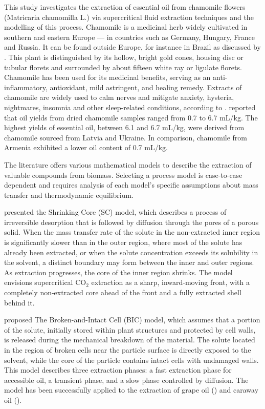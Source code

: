 \documentclass[../Article_Model_Parameters.tex]{subfiles}
\begin{document}
	This study investigates the extraction of essential oil from chamomile flowers (Matricaria chamomilla L.) via supercritical fluid extraction techniques and the modelling of this process. Chamomile is a medicinal herb widely cultivated in southern and eastern Europe — in countries such as Germany, Hungary, France and Russia. It can be found outside Europe, for instance in Brazil as discussed by \citet{Singh2011}. This plant is distinguished by its hollow, bright gold cones, housing disc or tubular florets and surrounded by about fifteen white ray or ligulate florets. Chamomile has been used for its medicinal benefits, serving as an anti-inflammatory, antioxidant, mild astringent, and healing remedy. Extracts of chamomile are widely used to calm nerves and mitigate anxiety, hysteria, nightmares, insomnia and other sleep-related conditions, according to \citet{Srivastava2009}. \citet{Orav2010} reported that oil yields from dried chamomile samples ranged from 0.7 to 6.7 mL/kg. The highest yields of essential oil, between 6.1 and 6.7 mL/kg, were derived from chamomile sourced from Latvia and Ukraine. In comparison, chamomile from Armenia exhibited a lower oil content of 0.7 mL/kg.
	
	The literature offers various mathematical models to describe the extraction of valuable compounds from biomass. Selecting a process model is case-to-case dependent and requires analysis of each model's specific assumptions about mass transfer and thermodynamic equilibrium.
	
	\citet{Goto1996} presented the Shrinking Core (SC) model, which describes a process of irreversible desorption that is followed by diffusion through the pores of a porous solid. When the mass transfer rate of the solute in the non-extracted inner region is significantly slower than in the outer region, where most of the solute has already been extracted, or when the solute concentration exceeds its solubility in the solvent, a distinct boundary may form between the inner and outer regions. As extraction progresses, the core of the inner region shrinks. The model envisions supercritical CO$_2$ extraction as a sharp, inward-moving front, with a completely non-extracted core ahead of the front and a fully extracted shell behind it.
		
	\citet{Sovova1994} proposed The Broken-and-Intact Cell (BIC) model, which assumes that a portion of the solute, initially stored within plant structures and protected by cell walls, is released during the mechanical breakdown of the material. The solute located in the region of broken cells near the particle surface is directly exposed to the solvent, while the core of the particle contains intact cells with undamaged walls. This model describes three extraction phases: a fast extraction phase for accessible oil, a transient phase, and a slow phase controlled by diffusion. The model has been successfully applied to the extraction of grape oil (\citet{Sovova1994b}) and caraway oil (\citet{Sovova1994a}).
		
\end{document}
